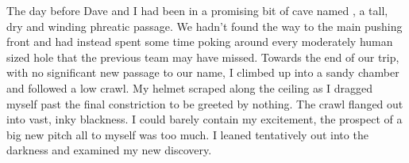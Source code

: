 The day before Dave and I had been in a promising bit of cave named , a tall, dry and winding phreatic passage. We hadn't found the way to the main pushing front and had instead spent some time poking around every moderately human sized hole that the previous team may have missed. Towards the end of our trip, with no significant new passage to our name, I climbed up into a sandy chamber and followed a low crawl. My helmet scraped along the ceiling as I dragged myself past the final constriction to be greeted by nothing. The crawl flanged out into vast, inky blackness. I could barely contain my excitement, the prospect of a big new pitch all to myself was too much. I leaned tentatively out into the darkness and examined my new discovery. 

\begin{marginsurvey}
\checkoddpage \ifoddpage \forcerectofloat \else \forceversofloat \fi
\centering

\end{marginsurvey}

